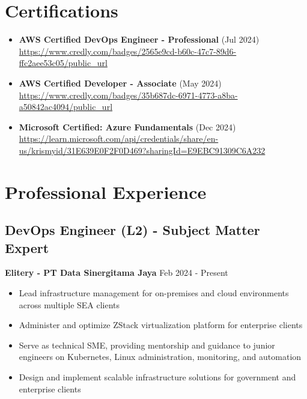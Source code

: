 \documentclass[11pt,a4paper]{article}
\newcommand{\company}[1]{\textbf{\color{primary}#1}}
\newcommand{\daterange}[1]{\color{secondary}#1}  %
\begin{document}
\section{Certifications}
\begin{itemize}[leftmargin=*, itemsep=8pt]
    \item \textbf{AWS Certified DevOps Engineer - Professional} (Jul 2024) \\
    \url{https://www.credly.com/badges/2565e9cd-b60c-47c7-89d6-ffc2aee53c05/public_url} \\
    
    \item \textbf{AWS Certified Developer - Associate} (May 2024) \\
    \url{https://www.credly.com/badges/35b687dc-6971-4773-a8ba-a50842ac4094/public_url} \\
    
    \item \textbf{Microsoft Certified: Azure Fundamentals} (Dec 2024) \\
    \url{https://learn.microsoft.com/api/credentials/share/en-us/krismyid/31E639E0F2F0D469?sharingId=E9EBC91309C6A232} \\
\end{itemize}

\section{Professional Experience}

\subsection{DevOps Engineer (L2) - Subject Matter Expert}
\company{Elitery - PT Data Sinergitama Jaya} \hfill \daterange{Feb 2024 - Present}
\begin{itemize}[leftmargin=*, itemsep=2pt]
    \item Lead infrastructure management for on-premises and cloud environments across multiple SEA clients
    \item Administer and optimize ZStack virtualization platform for enterprise clients
    \item Serve as technical SME, providing mentorship and guidance to junior engineers on Kubernetes, Linux administration, monitoring, and automation
    \item Design and implement scalable infrastructure solutions for government and enterprise clients
\end{itemize}
\end{document}
